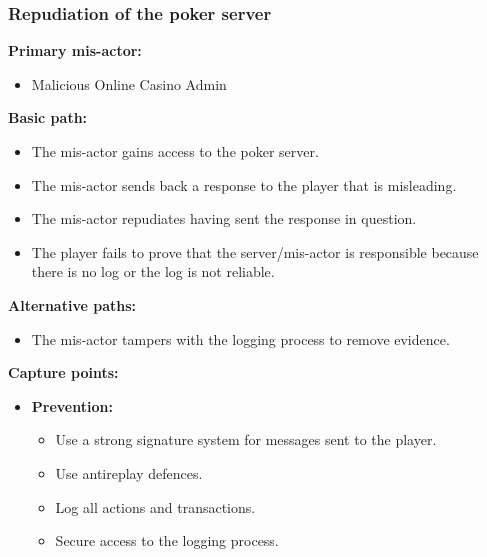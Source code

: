 \documentclass[a4paper,11pt]{report}
\begin{document}
\subsubsection{Repudiation of the poker server}
\label{PokerServerCasesR}
\textbf{Primary mis-actor:}
\begin{itemize}
\item Malicious Online Casino Admin
\end{itemize}
\textbf{Basic path:}
\begin{itemize}
\item The mis-actor gains access to the poker server.
\item The mis-actor sends back a response to the player that is misleading.
\item The mis-actor repudiates having sent the response in question.
\item The player fails to prove that the server/mis-actor is responsible because there is no log or the log is not reliable.
\end{itemize}
\textbf{Alternative paths:}
\begin{itemize}
\item The mis-actor tampers with the logging process to remove evidence.
\end{itemize}
\textbf{Capture points:}
\begin{itemize}
\item \textbf{Prevention:}
\begin{itemize}
\item Use a strong signature system for messages sent to the player.
\item Use antireplay defences.
\item Log all actions and transactions.
\item Secure access to the logging process.
\end{itemize}
\end{itemize}
\end{document}
